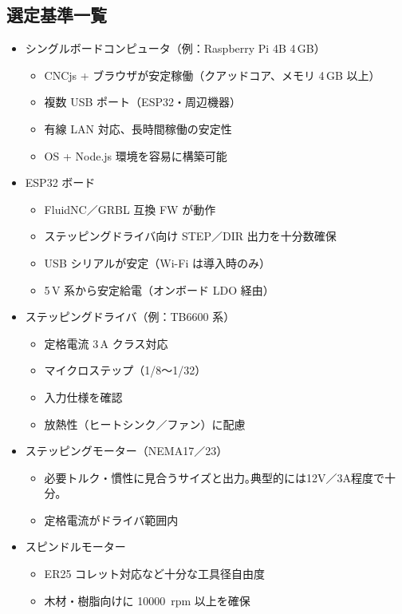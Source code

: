 \documentclass[uplatex,dvipdfmx]{ujarticle}
\begin{document}
\subsection*{選定基準一覧}

\begin{itemize}
  \item シングルボードコンピュータ（例：Raspberry Pi 4B 4\,GB）
    \begin{itemize}
      \item CNCjs + ブラウザが安定稼働（クアッドコア、メモリ 4\,GB 以上）
      \item 複数 USB ポート（ESP32・周辺機器）
      \item 有線 LAN 対応、長時間稼働の安定性
      \item OS + Node.js 環境を容易に構築可能
    \end{itemize}
  \item ESP32 ボード
    \begin{itemize}
      \item FluidNC／GRBL 互換 FW が動作
      \item ステッピングドライバ向け STEP／DIR 出力を十分数確保
      \item USB シリアルが安定（Wi-Fi は導入時のみ）
      \item 5\,V 系から安定給電（オンボード LDO 経由）
    \end{itemize}
  \item ステッピングドライバ（例：TB6600 系）
    \begin{itemize}
      \item 定格電流 3\,A クラス対応
      \item マイクロステップ（1/8～1/32）
      \item 入力仕様を確認
      \item 放熱性（ヒートシンク／ファン）に配慮
    \end{itemize}
  \item ステッピングモーター（NEMA17／23）
    \begin{itemize}
      \item 必要トルク・慣性に見合うサイズと出力｡典型的には12V／3A程度で十分｡
      \item 定格電流がドライバ範囲内
    \end{itemize}
  \item スピンドルモーター
    \begin{itemize}
      \item ER25 コレット対応など十分な工具径自由度
      \item 木材・樹脂向けに \SI{10000}{rpm} 以上を確保

\end{itemize}
\end{itemize}
\end{document}
